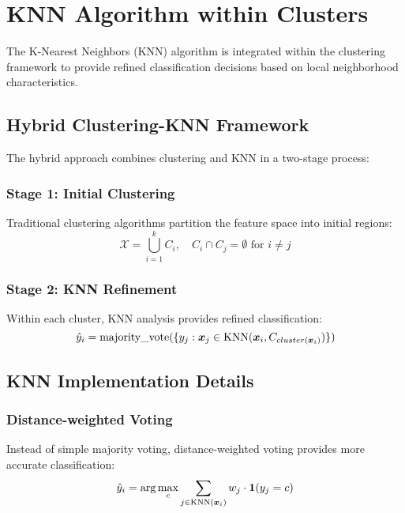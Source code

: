 
\section{KNN Algorithm within Clusters}
The K-Nearest Neighbors (KNN) algorithm is integrated within the clustering framework to provide refined classification decisions based on local neighborhood characteristics.

\subsection{Hybrid Clustering-KNN Framework}
The hybrid approach combines clustering and KNN in a two-stage process:

\subsubsection{Stage 1: Initial Clustering}
Traditional clustering algorithms partition the feature space into initial regions:
\begin{equation}
\mathcal{X} = \bigcup_{i=1}^{k} C_i, \quad C_i \cap C_j = \emptyset \text{ for } i \neq j
\end{equation}

\subsubsection{Stage 2: KNN Refinement}
Within each cluster, KNN analysis provides refined classification:
\begin{equation}
\hat{y}_i = \text{majority\_vote}(\{y_j : \boldsymbol{x}_j \in \text{KNN}(\boldsymbol{x}_i, C_{cluster(\boldsymbol{x}_i)})\})
\end{equation}

\subsection{KNN Implementation Details}

\subsubsection{Distance-weighted Voting}
Instead of simple majority voting, distance-weighted voting provides more accurate classification:
\begin{equation}
\hat{y}_i = \arg\max_{c} \sum_{j \in \text{KNN}(\boldsymbol{x}_i)} w_j \cdot \mathbf{1}(y_j = c)
\end{equation}

